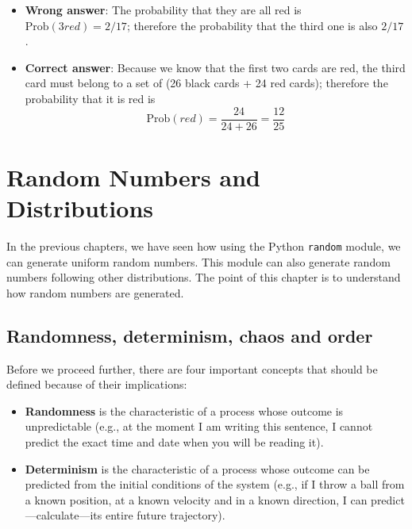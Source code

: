 \documentclass[justified, sixbynine]{tufte-book}
\def\ft{\small\tt}
\theoremstyle{plain}%
\newtheorem * {corollary}{Corollary}
\theoremstyle{definition}
\theoremstyle{remark}
\newtheorem * {remark}{Remark}
\newtheorem * {note}{Note}
\begin{document}
\begin{fullwidth}
\begin{itemize}
\item  {\bf Wrong answer}: The probability that they are all red is $%
\textrm{Prob}(3red)=2/17$; therefore the probability that the third one is also $2/17$.

\item  {\bf Correct answer}: Because we know that the first two cards are red, the third card must belong to a set of (26 black cards + 24 red cards);
therefore the probability that it is red is
\begin{equation}
\textrm{Prob}(red)=\frac{24}{24+26}=\frac{12}{25}
\end{equation}
\end{itemize}




\chapter{Random Numbers and Distributions}

In the previous chapters, we have seen how using the Python {\ft random} module, we can generate uniform random numbers. This module can also
generate random numbers following other distributions.
The point of this chapter is to understand how random numbers are generated.

\goodbreak\section{Randomness, determinism, chaos and order}

Before we proceed further, there are four important concepts that should be defined because of their implications:

\begin{itemize}
\item  {\bf Randomness} is the characteristic of a process whose outcome is
unpredictable (e.g., at the moment I am writing this sentence, I cannot
predict the exact time and date when you will be reading it).

\item  {\bf Determinism} is the characteristic of a process whose outcome
can be predicted from the initial conditions of the system (e.g., if I throw a
ball from a known position, at a known velocity and in a known direction, I
can predict---calculate---its entire future trajectory).


\end{itemize}
\end{fullwidth}
\end{document}
